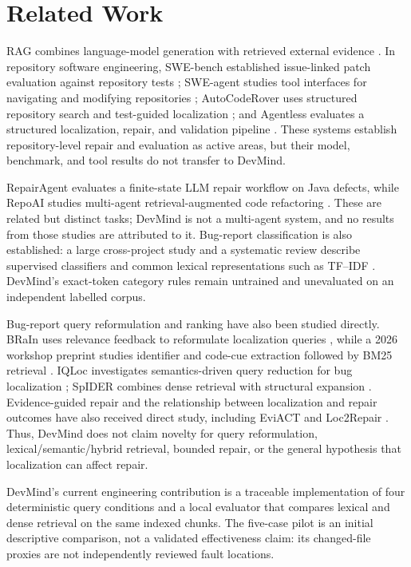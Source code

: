 \documentclass[3p,times,procedia]{elsarticle}
\begin{document}
\section{Related Work}
RAG combines language-model generation with retrieved external evidence \cite{Lewis2020}. In repository software engineering, SWE-bench established issue-linked patch evaluation against repository tests \cite{Jimenez2024}; SWE-agent studies tool interfaces for navigating and modifying repositories \cite{Yang2024}; AutoCodeRover uses structured repository search and test-guided localization \cite{Zhang2024}; and Agentless evaluates a structured localization, repair, and validation pipeline \cite{Agentless2025}. These systems establish repository-level repair and evaluation as active areas, but their model, benchmark, and tool results do not transfer to DevMind.

RepairAgent evaluates a finite-state LLM repair workflow on Java defects, while RepoAI studies multi-agent retrieval-augmented code refactoring \cite{RepairAgent2025,RepoAI2026}. These are related but distinct tasks; DevMind is not a multi-agent system, and no results from those studies are attributed to it. Bug-report classification is also established: a large cross-project study and a systematic review describe supervised classifiers and common lexical representations such as TF--IDF \cite{Andrade2026,Long2025}. DevMind's exact-token category rules remain untrained and unevaluated on an independent labelled corpus.

Bug-report query reformulation and ranking have also been studied directly. BRaIn uses relevance feedback to reformulate localization queries \cite{BRaIn2025}, while a 2026 workshop preprint studies identifier and code-cue extraction followed by BM25 retrieval \cite{Reformulate2026}. IQLoc investigates semantics-driven query reduction for bug localization \cite{IQLoc2026}; SpIDER combines dense retrieval with structural expansion \cite{SpIDER2026}. Evidence-guided repair and the relationship between localization and repair outcomes have also received direct study, including EviACT and Loc2Repair \cite{EviACT2026,Loc2Repair2026}. Thus, DevMind does not claim novelty for query reformulation, lexical/semantic/hybrid retrieval, bounded repair, or the general hypothesis that localization can affect repair.

DevMind's current engineering contribution is a traceable implementation of four deterministic query conditions and a local evaluator that compares lexical and dense retrieval on the same indexed chunks. The five-case pilot is an initial descriptive comparison, not a validated effectiveness claim: its changed-file proxies are not independently reviewed fault locations.
\end{document}
